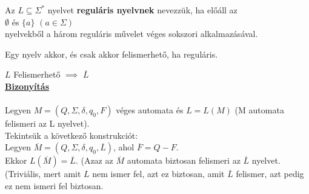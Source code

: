 \documentclass{beamer}
\newcommand{\msmallskip}{\vspace{0.3em}}
\newcommand{\mmedskip}{\vspace{0.5em}}
\begin{document}
\begin{frame}

\begin{tcolorbox}[title={Def.: Reguláris nyelv}]
Az $L \subseteq {\Sigma}^*$ nyelvet \textbf{reguláris nyelvnek} nevezzük, ha előáll az\\
$\emptyset$ és $\{a\}$ $(a \in {\Sigma})$\\
nyelvekből a három reguláris művelet véges sokszori alkalmazásával.
\end{tcolorbox}

\begin{tcolorbox}[title={Tétel: Kleene tétel}]
Egy nyelv akkor, és csak akkor felismerhető, ha reguláris.
\end{tcolorbox}

\end{frame}

\begin{frame}
\begin{tcolorbox}[title={Tétel: Felismerhető nyelvek komplementere}]
$L$ Felismerhető $\implies$ $\overline{L}$\\
\tcblower
\msmallskip
\underline{\textbf{Bizonyítás}}\\
\mmedskip
\\
Legyen $M = (Q, \Sigma , \delta , q_0, F)$ véges automata és $L = L(M)$ (M automata felismeri az L nyelvet).\\
Tekintsük a következő konstrukciót:\\
Legyen $\overline{M} = (Q, \Sigma , \delta, q_0, \overline{L})$, ahol $\overline{F} = Q - F$.\\
Ekkor  $L(\overline{M}) = \overline{L}$. (Azaz az $\overline{M}$ automata biztosan felismeri az $\overline{L}$ nyelvet.\\ 
(Triviális, mert amit $L$ nem ismer fel, azt ez biztosan, amit $\overline{L}$ felismer, azt pedig ez nem ismeri fel biztosan.

\end{tcolorbox}

\end{frame}
\end{document}
